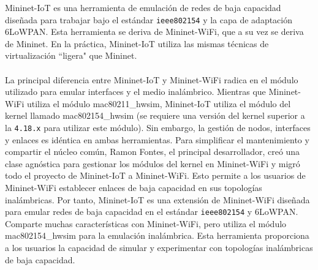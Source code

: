 Mininet-IoT \cite{mininetIOT} es una herramienta de emulación de redes de baja capacidad diseñada para trabajar bajo el estándar \texttt{ieee802154} y la capa de adaptación 6LoWPAN. Esta herramienta se deriva de Mininet-WiFi, que a su vez se deriva de Mininet. En la práctica, Mininet-IoT utiliza las mismas técnicas de virtualización ``ligera" que Mininet.\\
\\
La principal diferencia entre Mininet-IoT y Mininet-WiFi radica en el módulo utilizado para emular interfaces y el medio inalámbrico. Mientras que Mininet-WiFi utiliza el módulo mac80211\_hwsim, Mininet-IoT utiliza el módulo del kernel llamado mac802154\_hwsim (se requiere una versión del kernel superior a la \texttt{4.18.x} para utilizar este módulo). Sin embargo, la gestión de nodos, interfaces y enlaces es idéntica en ambas herramientas. Para simplificar el mantenimiento y compartir el núcleo común, Ramon Fontes, el principal desarrollador, creó una clase agnóstica para gestionar los módulos del kernel en Mininet-WiFi y migró todo el proyecto de Mininet-IoT a Mininet-WiFi. Esto permite a los usuarios de Mininet-WiFi establecer enlaces de baja capacidad en sus topologías inalámbricas. Por tanto, Mininet-IoT es una extensión de Mininet-WiFi diseñada para emular redes de baja capacidad en el estándar \texttt{ieee802154} y 6LoWPAN. Comparte muchas características con Mininet-WiFi, pero utiliza el módulo mac802154\_hwsim para la emulación inalámbrica. Esta herramienta proporciona a los usuarios la capacidad de simular y experimentar con topologías inalámbricas de baja capacidad.